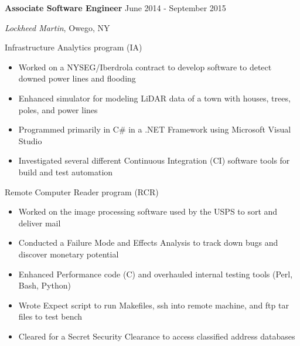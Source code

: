 
\vspace{5pt}

\textbf{Associate Software Engineer} \hfill June 2014 - September 2015

\textit{Lockheed Martin}, Owego, NY

\vspace{3pt}

Infrastructure Analytics program (IA)

\begin{itemize}
    \item Worked on a NYSEG/Iberdrola contract to develop software to detect downed power lines and flooding
    \item Enhanced simulator for modeling LiDAR data of a town with houses, trees, poles, and power lines
    \item Programmed primarily in C\# in a .NET Framework using Microsoft Visual Studio
    \item Investigated several different Continuous Integration (CI) software tools for build and test automation
\end{itemize}

\vspace{3pt}

Remote Computer Reader program (RCR)

\begin{itemize}
    \item Worked on the image processing software used by the USPS to sort and deliver mail
    \item Conducted a Failure Mode and Effects Analysis to track down bugs and discover monetary potential
    \item Enhanced Performance code (C) and overhauled internal testing tools (Perl, Bash, Python)
    \item Wrote Expect script to run Makefiles, ssh into remote machine, and ftp tar files to test bench
    \item Cleared for a Secret Security Clearance to access classified address databases
\end{itemize}
